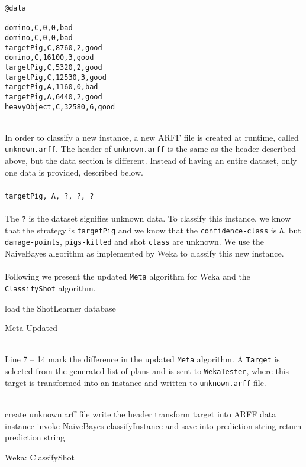 \begin{lstlisting}
@data

domino,C,0,0,bad
domino,C,0,0,bad
targetPig,C,8760,2,good
domino,C,16100,3,good
targetPig,C,5320,2,good
targetPig,C,12530,3,good
targetPig,A,1160,0,bad
targetPig,A,6440,2,good
heavyObject,C,32580,6,good
\end{lstlisting}
\ \\
In order to classify a new instance, a new ARFF file is created at runtime, called \texttt{unknown.arff}. The header of \texttt{unknown.arff} is the same as the header described above, but the data section is different. Instead of having an entire dataset, only one data is provided, described below.
\ \\
\ \\
\texttt{targetPig, A, ?, ?, ?}
\ \\
\ \\
The \texttt{?} is the dataset signifies unknown data. To classify this instance, we know that the strategy is \texttt{targetPig} and we know that the \texttt{confidence-class} is \texttt{A}, but \texttt{damage-points}, \texttt{pigs-killed} and shot \texttt{class} are unknown. We use the NaiveBayes algorithm as implemented by Weka to classify this new instance.
\ \\
\ \\
Following we present the updated \texttt{Meta} algorithm for Weka and the \texttt{ClassifyShot} algorithm.

\begin{algorithm}[H]
\SetAlgoLined
load the ShotLearner database\;
	 \caption{Meta-Updated} \label{algorithm:metaUpdated}
\end{algorithm}
\ \\
Line 7 – 14 mark the difference in the updated \texttt{Meta} algorithm. A \texttt{Target} is selected from the generated list of plans and is sent to \texttt{WekaTester}, where this target is transformed into an instance and written to \texttt{unknown.arff} file.
\ \\
\ \\
\begin{algorithm}[H]
\SetAlgoLined
create unknown.arff file\;
write the header\;
transform target into ARFF data instance\;
invoke NaiveBayes classifyInstance and save into prediction string\;
return prediction string\;

\caption{Weka: ClassifyShot}\label{algorithm:classifyShot}
\end{algorithm}
\ \\

